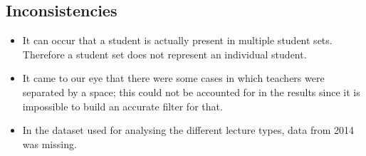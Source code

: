 \subsection{Inconsistencies}
\begin{itemize}
	\item It can occur that a student is actually present in multiple student sets. Therefore a student set does not represent an individual student.
	\item It came to our eye that there were some cases in which teachers were separated by a space; this could not be accounted for in the results since it is impossible to build an accurate filter for that.
	\item In the dataset used for analysing the different lecture types, data from 2014 was missing.
\end{itemize}